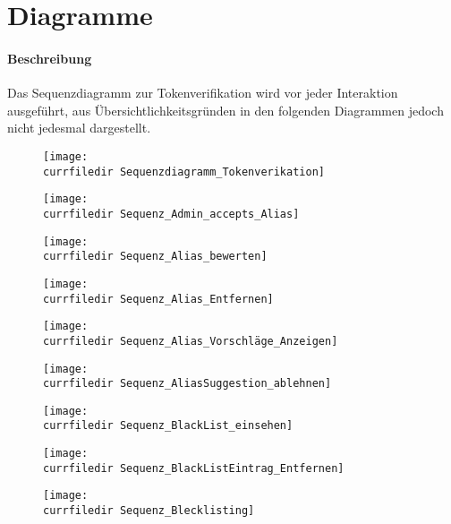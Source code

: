 \section{Diagramme}

\paragraph*{Beschreibung}
Das Sequenzdiagramm zur Tokenverifikation wird vor jeder Interaktion ausgeführt, aus Übersichtlichkeitsgründen
in den folgenden Diagrammen jedoch nicht jedesmal dargestellt.

\begin{figure}
    \centering
    \texttt{[image: \\currfiledir Sequenzdiagramm\_Tokenverikation]}
\end{figure}

\begin{figure}
    \centering
    \texttt{[image: \\currfiledir Sequenz\_Admin\_accepts\_Alias]}
\end{figure}

\begin{figure}
    \centering
    \texttt{[image: \\currfiledir Sequenz\_Alias\_bewerten]}
\end{figure}

\begin{figure}
    \centering
    \texttt{[image: \\currfiledir Sequenz\_Alias\_Entfernen]}
\end{figure}

\begin{figure}
    \centering
    \texttt{[image: \\currfiledir Sequenz\_Alias\_Vorschläge\_Anzeigen]}
\end{figure}

\begin{figure}
    \centering
    \texttt{[image: \\currfiledir Sequenz\_AliasSuggestion\_ablehnen]}
\end{figure}

\begin{figure}
    \centering
    \texttt{[image: \\currfiledir Sequenz\_BlackList\_einsehen]}
\end{figure}

\begin{figure}
    \centering
    \texttt{[image: \\currfiledir Sequenz\_BlackListEintrag\_Entfernen]}
\end{figure}

\begin{figure}
    \centering
    \texttt{[image: \\currfiledir Sequenz\_Blecklisting]}
\end{figure}

